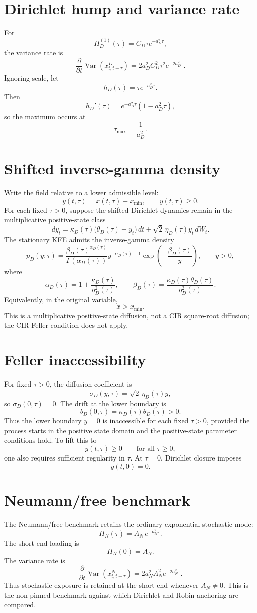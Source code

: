 \documentclass[11pt,oneside]{book}
\begin{document}
\section{Dirichlet hump and variance rate}
For
\[
H_D^{(1)}(\tau)=C_D\tau e^{-a_D^2\tau},
\]
the variance rate is
\[
\frac{\partial}{\partial t}\operatorname{Var}(x^D_{t,t+\tau})
=
2a_D^2C_D^2\tau^2e^{-2a_D^2\tau}.
\]
Ignoring scale, let
\[
h_D(\tau)=\tau e^{-a_D^2\tau}.
\]
Then
\[
h_D'(\tau)=e^{-a_D^2\tau}(1-a_D^2\tau),
\]
so the maximum occurs at
\[
\tau_{\max}=\frac{1}{a_D^2}.
\]

\section{Shifted inverse-gamma density}
Write the field relative to a lower admissible level:
\[
y(t,\tau)=x(t,\tau)-x_{\min},
\qquad y(t,\tau)\ge0.
\]
For each fixed \(\tau>0\), suppose the shifted Dirichlet dynamics remain in the multiplicative positive-state class
\[
dy_t
=
\kappa_D(\tau)\bigl(\theta_D(\tau)-y_t\bigr)\,dt
+
\sqrt{2}\,\eta_D(\tau)y_t\,dW_t.
\]
The stationary KFE admits the inverse-gamma density
\[
p_D(y;\tau)
=
\frac{\beta_D(\tau)^{\alpha_D(\tau)}}{\Gamma(\alpha_D(\tau))}
 y^{-\alpha_D(\tau)-1}
\exp\left(-\frac{\beta_D(\tau)}{y}\right),
\qquad y>0,
\]
where
\[
\alpha_D(\tau)=1+\frac{\kappa_D(\tau)}{\eta_D^2(\tau)},
\qquad
\beta_D(\tau)=\frac{\kappa_D(\tau)\theta_D(\tau)}{\eta_D^2(\tau)}.
\]
Equivalently, in the original variable,
\[
x>x_{\min}.
\]
This is a multiplicative positive-state diffusion, not a CIR square-root diffusion; the CIR Feller condition does not apply.

\section{Feller inaccessibility}
For fixed \(\tau>0\), the diffusion coefficient is
\[
\sigma_D(y,\tau)=\sqrt{2}\,\eta_D(\tau)y,
\]
so \(\sigma_D(0,\tau)=0\). The drift at the lower boundary is
\[
b_D(0,\tau)=\kappa_D(\tau)\theta_D(\tau)>0.
\]
Thus the lower boundary \(y=0\) is inaccessible for each fixed \(\tau>0\), provided the process starts in the positive state domain and the positive-state parameter conditions hold. To lift this to
\[
y(t,\tau)\ge0
\qquad\text{for all }\tau\ge0,
\]
one also requires sufficient regularity in \(\tau\). At \(\tau=0\), Dirichlet closure imposes
\[
y(t,0)=0.
\]

\section{Neumann/free benchmark}
The Neumann/free benchmark retains the ordinary exponential stochastic mode:
\[
H_N(\tau)=A_N\,e^{-a_N^2\tau}.
\]
The short-end loading is
\[
H_N(0)=A_N.
\]
The variance rate is
\[
\frac{\partial}{\partial t}\operatorname{Var}(x^N_{t,t+\tau})
=
2a_N^2A_N^2e^{-2a_N^2\tau}.
\]
Thus stochastic exposure is retained at the short end whenever \(A_N\neq0\). This is the non-pinned benchmark against which Dirichlet and Robin anchoring are compared.
\end{document}
